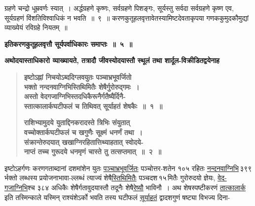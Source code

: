 \documentclass[11pt, openany]{book}
\begin{document}
\newpage

\begin{sloppypar}
\noindent ग्रहणे चन्द्रो धूम्रवर्णः स्यात्~। अर्द्धग्रहणे कृष्णः, सर्वग्रहणे पिशङ्गः, सूर्यस्तु सर्वदा सर्वग्रहणे कृष्ण एव, सूर्यग्रहणं विंशतिविश्वाधिकं न भवति~॥~९~॥ करणकुतूहलवृत्तावेतस्यामिष्टदेवताकृपया गणककुमुदकौमुद्यां व्याख्येयं रविग्रहे नियतम्~॥
\vspace{2mm}

\begin{center}
{\large \textbf{इतिकरणकुतूहलवृत्तौ सूर्यपर्वाधिकारः समाप्तः~॥~५~॥}}
\end{center}
\vspace{2mm}

{\small \textbf{अथोदयास्ताधिकारो व्याख्यायते, तत्रादौ जीवस्योदयास्तौ स्थूलं तथा शार्दूल-विक्रीडितद्वयेनाह\textendash }}

 \label{6.1}
\begin{quote}
{\large \textbf{{\color{purple}इष्टोऽह्नां निचयोऽब्ददिग्लवयुतः पञ्चाभ्रभूवर्जितो \\
भक्तो नन्दनवाग्निभिस्तिथिमितैः शेषैर्गुरोरुद्गमः~। \\
अस्तो वेदगजाग्निभिस्तदधिकैरूनैर्गतैष्यैर्दिनै-\\
स्तात्कालार्कघटीफलं च तिथिवत् सूर्याहतं शेषकैः~॥~१~॥ }}
\vspace{1mm}

 \label{6.2}
\textbf{{\color{purple}राशिभ्यामुदये युताद्दिनकरादस्ते त्रिभिः संयुतात् \\
वच्चोक्तार्कघटीफलं च खगुणैः सूक्ष्मं धनर्णं तथा~। \\
संक्रान्तेरुदयात् खखाग्निरहितात्तिथ्याहतात् स्वोदये- \\
नाप्तं तच्च गुरूदये धनमृणं चास्ते तु तत्सप्तमात्~॥~२~॥}}}
\end{quote}

इष्टोऽहर्गणः करणगताब्दानां दशमांशेन युतः \hyperref[6.1]{पञ्चाभ्रभूवर्जितः} पञ्चोत्तर-शतेन १०५ रहितः \hyperref[6.1]{नन्दनवाग्निभि}\textendash \,३९९\textendash \,र्भक्तो लब्धस्य प्रयोजनाभावा-ल्लब्धं त्याज्यं शेषै\hyperref[6.1]{स्तिथिमितैः} पञ्चदश\textendash \,१५\textendash \,मितैः गुरोरुदयो ज्ञेयः, \hyperref[6.1]{वेद-गजाग्निभि}श्च ३८४ अधिकैः शेषैर्गतावुदयास्तौ तदूनैः शेषै\hyperref[6.1]{रेष्यौ} भाविनौ~। अथ शेषस्पष्टीकरणं \hyperref[6.1]{तात्कालार्क} इति तस्मिन्काले यस्मिन् राश्यंशेऽर्को भवति तस्य घटीफलं \hyperref[6.1]{सूर्याहतं} द्वादशगुणं षष्ट्या विभज्य दिना-
\end{sloppypar}
\end{document}
